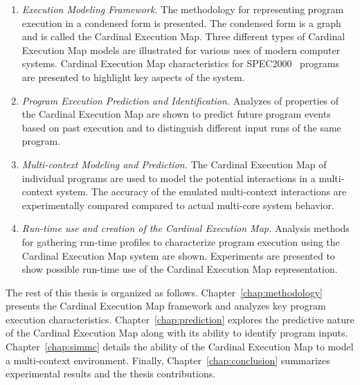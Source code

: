 \begin{enumerate}

    \item \textit{Execution Modeling Framework.}  The methodology for
representing program execution in a condensed form is presented. The
condensed form is a graph and is called the Cardinal Execution Map.
Three different types of Cardinal Execution Map
models are illustrated for various uses of modern computer systems.
Cardinal Execution Map characteristics for SPEC2000~\cite{spec:2000} programs are
presented to highlight key aspects of the system.

    \item \textit{Program Execution Prediction and Identification.}
Analyzes of properties of the Cardinal Execution Map are shown to predict future
program events
based on past execution and to distinguish different input runs of the same
program.

    \item \textit{Multi-context Modeling and Prediction.}  The
Cardinal Execution Map of individual programs are used to model the
potential interactions in a multi-context system.
The accuracy of the emulated multi-context interactions are experimentally compared
compared to actual multi-core system behavior.

    \item \textit{Run-time use and creation of the Cardinal Execution Map.}
Analysis methods for gathering run-time profiles to characterize program
execution using the Cardinal Execution Map system are shown. Experiments are
presented to show possible run-time use of the Cardinal Execution Map
representation.

\end{enumerate}

The rest of this thesis is organized as follows. Chapter~\ref{chap:methodology}
presents the Cardinal Execution Map framework and analyzes key program execution
characteristics. Chapter~\ref{chap:prediction} explores the predictive nature of
the Cardinal Execution Map along with its ability to identify program
inputs. Chapter~\ref{chap:simmc} details the ability of the Cardinal Execution
Map to model a multi-context environment. Finally, Chapter~\ref{chap:conclusion}
summarizes experimental results and the thesis contributions.

